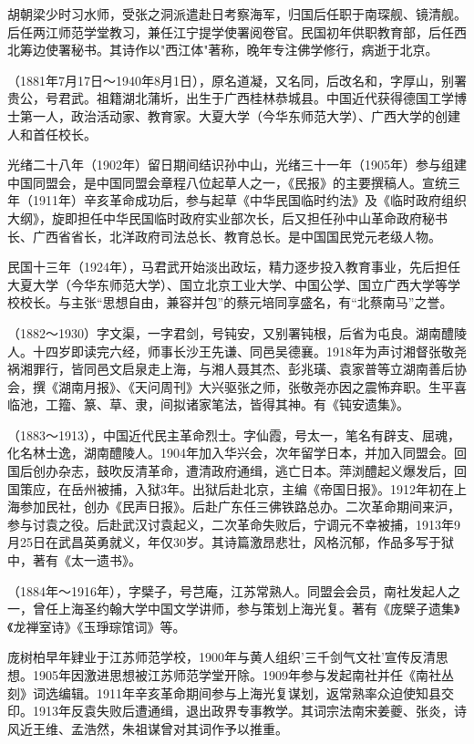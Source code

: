 \begin{description}
        胡朝梁少时习水师，受张之洞派遣赴日考察海军，归国后任职于南琛舰、镜清舰。后任两江师范学堂教习，兼任江宁提学使署阅卷官。民国初年供职教育部，后任西北筹边使署秘书。其诗作以"西江体"著称，晚年专注佛学修行，病逝于北京。
  \item[马君武] （1881年7月17日～1940年8月1日），原名道凝，又名同，后改名和，字厚山，别署贵公，号君武。祖籍湖北蒲圻，出生于广西桂林恭城县。中国近代获得德国工学博士第一人，政治活动家、教育家。大夏大学（今华东师范大学）、广西大学的创建人和首任校长。\par
        光绪二十八年（1902年）留日期间结识孙中山，光绪三十一年（1905年）参与组建中国同盟会，是中国同盟会章程八位起草人之一，《民报》的主要撰稿人。宣统三年（1911年）辛亥革命成功后，参与起草《中华民国临时约法》及《临时政府组织大纲》，旋即担任中华民国临时政府实业部次长，后又担任孙中山革命政府秘书长、广西省省长，北洋政府司法总长、教育总长。是中国国民党元老级人物。\par
        民国十三年（1924年），马君武开始淡出政坛，精力逐步投入教育事业，先后担任大夏大学（今华东师范大学）、国立北京工业大学、中国公学、国立广西大学等学校校长。与主张“思想自由，兼容并包”的蔡元培同享盛名，有“北蔡南马”之誉。
  \item[傅熊湘] （1882～1930）字文渠，一字君剑，号钝安，又别署钝根，后省为屯良。湖南醴陵人。十四岁即读完六经，师事长沙王先谦、同邑吴德襄。1918年为声讨湘督张敬尧祸湘罪行，皆同邑文启泉走上海，与湘人聂其杰、彭兆璜、袁家普等立湖南善后协会，撰《湖南月报》、《天问周刊》大兴驱张之师，张敬尧亦因之震怖弃职。生平喜临池，工籀、篆、草、隶，间拟诸家笔法，皆得其神。有《钝安遗集》。
  \item[宁调元] （1883～1913），中国近代民主革命烈士。字仙霞，号太一，笔名有辟支、屈魂，化名林士逸，湖南醴陵人。1904年加入华兴会，次年留学日本，并加入同盟会。回国后创办杂志，鼓吹反清革命，遭清政府通缉，逃亡日本。萍浏醴起义爆发后，回国策应，在岳州被捕，入狱3年。出狱后赴北京，主编《帝国日报》。1912年初在上海参加民社，创办《民声日报》。后赴广东任三佛铁路总办。二次革命期间来沪，参与讨袁之役。后赴武汉讨袁起义，二次革命失败后，宁调元不幸被捕，1913年9月25日在武昌英勇就义，年仅30岁。其诗篇激昂悲壮，风格沉郁，作品多写于狱中，著有《太一遗书》。
  \item[庞树柏] （1884年～1916年），字檗子，号芑庵，江苏常熟人。同盟会会员，南社发起人之一，曾任上海圣约翰大学中国文学讲师，参与策划上海光复。著有《庞檗子遗集》《龙禅室诗》《玉琤琮馆词》等。\par
        庞树柏早年肄业于江苏师范学校，1900年与黄人组织'三千剑气文社'宣传反清思想。1905年因激进思想被江苏师范学堂开除。1909年参与发起南社并任《南社丛刻》词选编辑。1911年辛亥革命期间参与上海光复谋划，返常熟率众迫使知县交印。1913年反袁失败后遭通缉，退出政界专事教学。其词宗法南宋姜夔、张炎，诗风近王维、孟浩然，朱祖谋曾对其词作予以推重。

\end{description}
